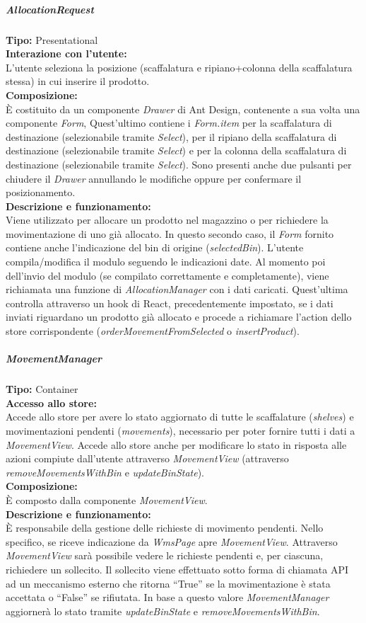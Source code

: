 \subparagraph{\colorbox{verde_uml}{AllocationRequest}}
\textbf{Tipo:} Presentational \\
\textbf{Interazione con l'utente:} \\
L'utente seleziona la posizione (scaffalatura e ripiano+colonna della scaffalatura stessa) in cui inserire il prodotto. \\
\textbf{Composizione:} \\
È costituito da un componente \textit{Drawer} di Ant Design, contenente a sua volta una componente \textit{Form}, Quest'ultimo 
contiene i \textit{Form.item} per la scaffalatura di destinazione (selezionabile tramite \textit{Select}), per il ripiano della scaffalatura di destinazione (selezionabile tramite \textit{Select}) e per la colonna della scaffalatura di destinazione (selezionabile tramite \textit{Select}). Sono presenti anche due pulsanti per chiudere il \textit{Drawer} annullando le modifiche oppure per confermare il posizionamento.\\
\textbf{Descrizione e funzionamento:} \\
Viene utilizzato per allocare un prodotto nel magazzino o per richiedere la movimentazione di uno già allocato. In questo secondo caso, il \textit{Form} fornito contiene anche l'indicazione del bin di origine (\textit{selectedBin}). L'utente compila/modifica il modulo seguendo le indicazioni date. Al momento poi dell'invio del modulo (se compilato correttamente e completamente), viene richiamata una funzione di \textit{AllocationManager} con i dati caricati. Quest'ultima controlla attraverso un hook di React, precedentemente impostato, se i dati inviati riguardano un prodotto già allocato e procede a richiamare l'action dello store corrispondente (\textit{orderMovementFromSelected} o \textit{insertProduct}).

\subparagraph{\colorbox{verde_uml}{MovementManager}}
\textbf{Tipo:} Container \\
\textbf{Accesso allo store:} \\
Accede allo store per avere lo stato aggiornato di tutte le scaffalature (\textit{shelves}) e movimentazioni pendenti (\textit{movements}), necessario per poter fornire tutti i dati a \textit{MovementView}. Accede allo store anche per modificare lo stato in risposta alle azioni compiute dall'utente attraverso \textit{MovementView} (attraverso \textit{removeMovementsWithBin} e \textit{updateBinState}).\\
\textbf{Composizione:} \\
È composto dalla componente \textit{MovementView}.\\
\textbf{Descrizione e funzionamento:} \\
È responsabile della gestione delle richieste di movimento pendenti. 
Nello specifico, se riceve indicazione da \textit{WmsPage} apre \textit{MovementView}. Attraverso \textit{MovementView} sarà possibile vedere le richieste pendenti e, per ciascuna, richiedere un sollecito. Il sollecito viene effettuato sotto forma di chiamata API ad un meccanismo esterno che ritorna ``True'' se la movimentazione è stata accettata o ``False'' se rifiutata. In base a questo valore \textit{MovementManager} aggiornerà lo stato tramite \textit{updateBinState} e \textit{removeMovementsWithBin}.

